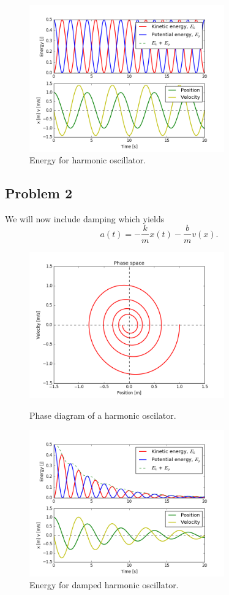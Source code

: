 \documentclass{article}
\begin{document}
\begin{figure}[H]
\centering
\includegraphics[width=0.75\textwidth]{problem_1_2}
\caption{Energy for harmonic oscillator.}
\label{fig:problem_b_contour_fig}
\end{figure}

\subsection*{Problem 2}
We will now include damping which yields
\begin{equation}
a(t) = -\frac{k}{m}x(t) - \frac{b}{m}v(x).
\end{equation}
\begin{figure}[H]
\centering
\includegraphics[width=0.75\textwidth]{problem_2_1}\label{figure_1}
\caption{Phase diagram of a harmonic oscilator.}
\label{fig:problem_b_contour_fig}
\end{figure}
\begin{figure}[H]
\centering
\includegraphics[width=0.75\textwidth]{problem_2_2}
\caption{Energy for damped harmonic oscillator.}
\label{fig:problem_b_contour_fig}
\end{figure}
\end{document}
